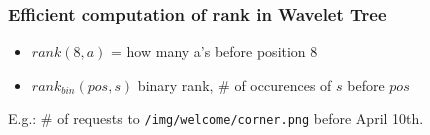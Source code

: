 \documentclass{beamer}
\begin{document}
\begin{frame}
\frametitle{Efficient computation of rank in Wavelet Tree}
\begin{itemize}
  \item $rank(8, a)$ = how many a's before position 8
  \item $rank_{bin}(pos, s)$ binary rank, \# of occurences of $s$ before $pos$  
\end{itemize}
\begin{figure}
\end{figure}
{\small E.g.: \# of requests to \texttt{/img/welcome/corner.png} before April 10th.}
\end{frame}


\end{document}
